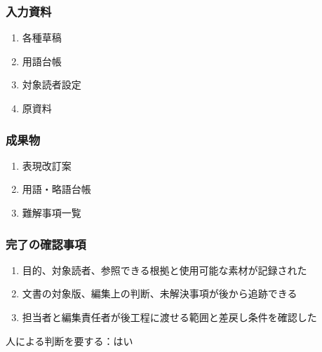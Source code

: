 \documentclass[a4paper,11pt]{article}
\begin{document}
\subsubsection*{入力資料}
\begin{enumerate}[leftmargin=2em,itemsep=0.35em]
\item 各種草稿
\item 用語台帳
\item 対象読者設定
\item 原資料
\end{enumerate}
\subsubsection*{成果物}
\begin{enumerate}[leftmargin=2em,itemsep=0.35em]
\item 表現改訂案
\item 用語・略語台帳
\item 難解事項一覧
\end{enumerate}
\subsubsection*{完了の確認事項}
\begin{enumerate}[leftmargin=2em,itemsep=0.35em]
\item 目的、対象読者、参照できる根拠と使用可能な素材が記録された
\item 文書の対象版、編集上の判断、未解決事項が後から追跡できる
\item 担当者と編集責任者が後工程に渡せる範囲と差戻し条件を確認した
\end{enumerate}
\par 人による判断を要する：はい\par\medskip
\end{document}
